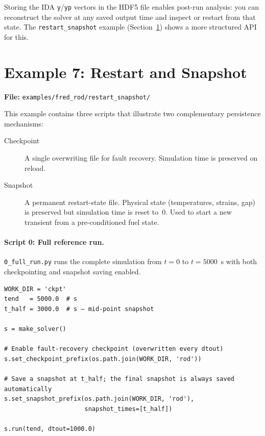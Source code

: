 \documentclass[11pt,a4paper]{article}
\begin{document}
\begin{infobox}
  Storing the IDA \texttt{y}/\texttt{yp} vectors in the HDF5 file enables
  post-run analysis: you can reconstruct the solver at any saved output time
  and inspect or restart from that state.  The \texttt{restart\_snapshot}
  example (Section~\ref{sec:rs}) shows a more structured API for this.
\end{infobox}

\section{Example 7: Restart and Snapshot}
\label{sec:rs}

\textbf{File:} \texttt{examples/fred\_rod/restart\_snapshot/}

\medskip
This example contains three scripts that illustrate two complementary
persistence mechanisms:

\begin{description}
  \item[Checkpoint] A single overwriting file for fault recovery.  Simulation
        time is preserved on reload.
  \item[Snapshot] A permanent restart-state file.  Physical state (temperatures,
        strains, gap) is preserved but simulation time is reset to~0.  Used to
        start a new transient from a pre-conditioned fuel state.
\end{description}

\paragraph{Script 0: Full reference run.}

\texttt{0\_full\_run.py} runs the complete simulation from $t=0$ to $t=5000$~s
with both checkpointing and snapshot saving enabled.

\begin{lstlisting}
WORK_DIR = 'ckpt'
tend   = 5000.0  # s
t_half = 3000.0  # s — mid-point snapshot

s = make_solver()

# Enable fault-recovery checkpoint (overwritten every dtout)
s.set_checkpoint_prefix(os.path.join(WORK_DIR, 'rod'))

# Save a snapshot at t_half; the final snapshot is always saved automatically
s.set_snapshot_prefix(os.path.join(WORK_DIR, 'rod'),
                      snapshot_times=[t_half])

s.run(tend, dtout=1000.0)
\end{lstlisting}
\end{document}
